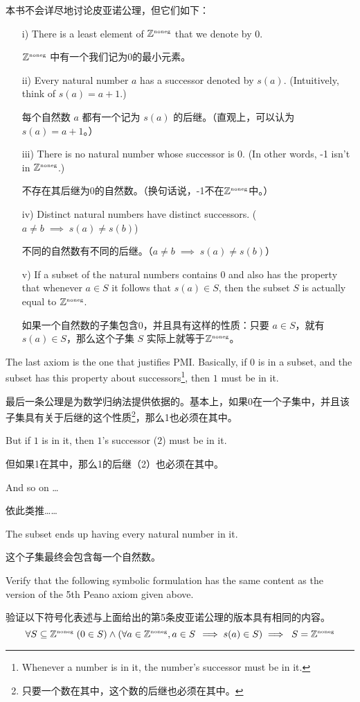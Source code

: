 本书不会详尽地讨论皮亚诺公理，但它们如下：

\begin{enumerate}
\item[i)] There is a least element of ${\mathbb Z}^{\mbox{\tiny noneg}}$ that we denote by $0$.

${\mathbb Z}^{\mbox{\tiny noneg}}$ 中有一个我们记为0的最小元素。
\item[ii)] Every natural number $a$ has a successor denoted by $s(a)$.
(Intuitively, think of $s(a) = a+1$.)

每个自然数 $a$ 都有一个记为 $s(a)$ 的后继。（直观上，可以认为 $s(a) = a+1$。）
\item[iii)] There is no natural number whose successor is $0$.
(In other
words, -1 isn't in ${\mathbb Z}^{\mbox{\tiny noneg}}$.)

不存在其后继为0的自然数。（换句话说，-1不在${\mathbb Z}^{\mbox{\tiny noneg}}$中。）
\item[iv)] Distinct natural numbers have distinct successors.
($a \neq b \; \implies \; s(a) \neq s(b)$) 

不同的自然数有不同的后继。（$a \neq b \; \implies \; s(a) \neq s(b)$）
\item[v)] If a subset of the natural numbers contains $0$ and also has the
property that whenever $a \in S$ it follows that $s(a) \in S$, then the
subset $S$ is actually equal to ${\mathbb Z}^{\mbox{\tiny noneg}}$.

如果一个自然数的子集包含0，并且具有这样的性质：只要 $a \in S$，就有 $s(a) \in S$，那么这个子集 $S$ 实际上就等于${\mathbb Z}^{\mbox{\tiny noneg}}$。
\end{enumerate}

The last axiom is the one that justifies PMI.  Basically, if $0$ is in
a subset, and the subset has this property about successors\footnote{Whenever a number is in it, the number's successor must be in it.}, then $1$ must
be in it.

最后一条公理是为数学归纳法提供依据的。基本上，如果0在一个子集中，并且该子集具有关于后继的这个性质\footnote{只要一个数在其中，这个数的后继也必须在其中。}，那么1也必须在其中。

But if $1$ is in it, then $1$'s successor ($2$) must be in it.

但如果1在其中，那么1的后继（2）也必须在其中。

And so on \ldots  

依此类推……

The subset ends up having every natural number in it.

这个子集最终会包含每一个自然数。

\begin{exer}
Verify that the following symbolic formulation has the same content
as the version of the 5th Peano axiom given above.

验证以下符号化表述与上面给出的第5条皮亚诺公理的版本具有相同的内容。
\[ \forall S \subseteq {\mathbb Z}^{\mbox{\tiny noneg}} \; ( 0 \in S ) \land (\forall a \in {\mathbb Z}^{\mbox{\tiny noneg}}, a \in S \, \implies s(a) \in S) \implies  \; S={\mathbb Z}^{\mbox{\tiny noneg}} \]

\end{exer}
\bigskip

